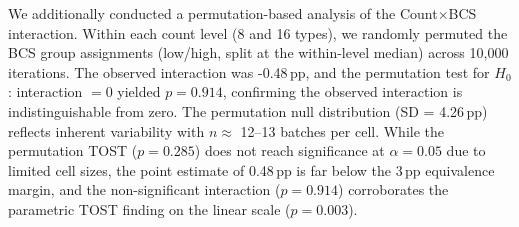 We additionally conducted a permutation-based analysis of the Count$\times$BCS interaction.
Within each count level (8 and 16 types), we randomly permuted the BCS group assignments (low/high, split at the within-level median) across 10,000 iterations.
The observed interaction was -0.48\,pp, and the permutation test for $H_0$: interaction $= 0$ yielded $p = 0.914$, confirming the observed interaction is indistinguishable from zero.
The permutation null distribution (SD = 4.26\,pp) reflects inherent variability with $n \approx$ 12--13 batches per cell.
While the permutation TOST ($p = 0.285$) does not reach significance at $\alpha = 0.05$ due to limited cell sizes, the point estimate of 0.48\,pp is far below the 3\,pp equivalence margin, and the non-significant interaction ($p = 0.914$) corroborates the parametric TOST finding on the linear scale ($p = 0.003$).
